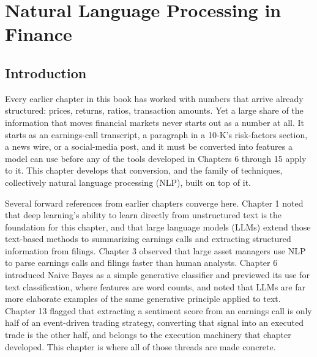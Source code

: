 \documentclass[../ai_in_finance]{subfiles}
\begin{document}
\chapter{Natural Language Processing in Finance}

\section{Introduction}

Every earlier chapter in this book has worked with numbers that arrive already structured: prices, returns, ratios, transaction amounts. Yet a large share of the information that moves financial markets never starts out as a number at all. It starts as an earnings-call transcript, a paragraph in a 10-K's risk-factors section, a news wire, or a social-media post, and it must be converted into features a model can use before any of the tools developed in Chapters 6 through 15 apply to it. This chapter develops that conversion, and the family of techniques, collectively natural language processing (NLP), built on top of it.

Several forward references from earlier chapters converge here. Chapter 1 noted that deep learning's ability to learn directly from unstructured text is the foundation for this chapter, and that large language models (LLMs) extend those text-based methods to summarizing earnings calls and extracting structured information from filings. Chapter 3 observed that large asset managers use NLP to parse earnings calls and filings faster than human analysts. Chapter 6 introduced Naive Bayes as a simple generative classifier and previewed its use for text classification, where features are word counts, and noted that LLMs are far more elaborate examples of the same generative principle applied to text. Chapter 13 flagged that extracting a sentiment score from an earnings call is only half of an event-driven trading strategy, converting that signal into an executed trade is the other half, and belongs to the execution machinery that chapter developed. This chapter is where all of those threads are made concrete.
\end{document}
